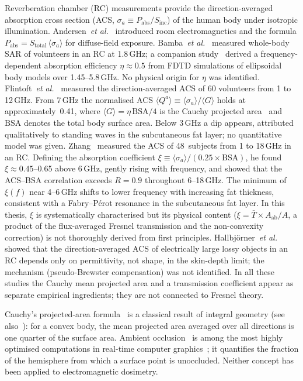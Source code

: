 \documentclass[11pt,a4paper]{article}
\theoremstyle{definition}      %
\newcommand{\Sinc}{S_{\mathrm{inc}}}
\newcommand{\Aab}{A_{\mathrm{ab}}}
\newcommand{\Tbar}{\bar{T}}
\begin{document}
Reverberation chamber (RC) measurements provide the direction-averaged
absorption cross section (ACS, $\sigma_a \equiv P_{\mathrm{abs}}/\Sinc$)
of the human body under isotropic illumination.
Andersen~\textit{et al.}~\cite{Andersen2007} introduced room
electromagnetics and the formula
$P_{\mathrm{abs}} = S_{\mathrm{total}} \,\langle\sigma_a\rangle$
for diffuse-field exposure.
Bamba~\textit{et al.}~\cite{Bamba2012} measured whole-body SAR of
volunteers in an RC at 1.8\,GHz; a companion study~\cite{Bamba2014}
derived a frequency-dependent absorption efficiency $\eta \approx 0.5$
from FDTD simulations of ellipsoidal body models over 1.45--5.8\,GHz.
No physical origin for $\eta$ was identified.
Flintoft~\textit{et al.}~\cite{Flintoft2014} measured the
direction-averaged ACS of 60 volunteers from 1 to 12\,GHz.
From 7\,GHz the normalised ACS
$\langle Q^a\rangle \equiv \langle\sigma_a\rangle/\langle G\rangle$
holds at approximately~0.41, where
$\langle G\rangle = \eta\,\mathrm{BSA}/4$ is the
Cauchy projected area~\cite{Cauchy1841,Vouk1948} and
$\mathrm{BSA}$ denotes the total body surface area.
Below 3\,GHz a dip appears, attributed qualitatively to standing
waves in the subcutaneous fat layer; no quantitative model was given.
Zhang~\cite{Zhang2017thesis,ZhangRobinson2020} measured the ACS of
48~subjects from 1 to 18\,GHz in an RC.
Defining the absorption coefficient
$\xi \equiv \langle\sigma_a\rangle/(0.25\times\mathrm{BSA})$,
he found $\xi \approx 0.45$--0.65 above 6\,GHz, gently rising with
frequency, and showed that the ACS--BSA correlation exceeds
$R = 0.9$ throughout 6--18\,GHz.
The minimum of $\xi(f)$ near 4--6\,GHz shifts to lower frequency with
increasing fat thickness, consistent with a Fabry--P\'{e}rot resonance in
the subcutaneous fat layer.
In this thesis, $\xi$ is systematically characterised but its
physical content ($\xi = \Tbar \times \Aab/A$, a product of the
flux-averaged Fresnel transmission and the non-convexity correction)
is not thoroughly derived from first principles.
Hallbj\"{o}rner~\textit{et al.}~\cite{Hallbjorner2005} showed that
the direction-averaged ACS of electrically large lossy objects in an
RC depends only on permittivity, not shape, in the skin-depth limit;
the mechanism (pseudo-Brewster compensation) was not identified.
In all these studies the Cauchy mean projected area and a transmission
coefficient appear as separate empirical ingredients;
they are not connected to Fresnel theory.

Cauchy's projected-area formula~\cite{Cauchy1841} is a classical
result of integral geometry (see
also~\cite{Hadwiger1957,SchneiderWeil2008}): for a convex body, the
mean projected area averaged over all directions is one quarter of the
surface area.
Ambient occlusion~\cite{Zhukov1998,Landis2002} is among the most
highly optimised computations in real-time computer
graphics~\cite{Pharr2016,AkenineMoller2018}; it quantifies the
fraction of the hemisphere from which a surface point is unoccluded.
Neither concept has been applied to electromagnetic dosimetry.
\end{document}
